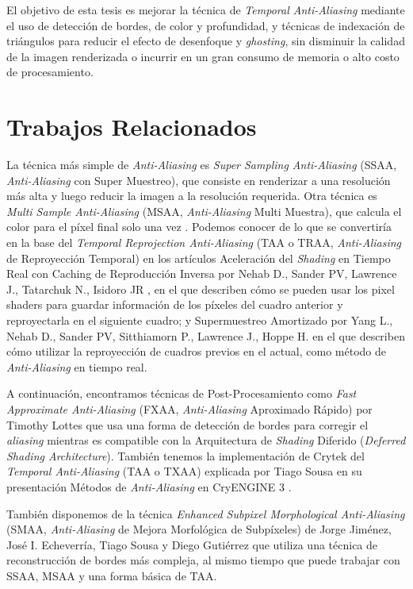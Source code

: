 \documentclass[pregrado]{tesis-usb} %
\begin{document}
El objetivo de esta tesis es mejorar la técnica de \textit{Temporal Anti-Aliasing} mediante el uso de detección de bordes, de color y profundidad, y técnicas de indexación de triángulos para reducir el efecto de desenfoque y \textit{ghosting}, sin disminuir la calidad de la imagen renderizada o incurrir en un gran consumo de memoria o alto costo de procesamiento.


\section{Trabajos Relacionados}
La técnica más simple de \textit{Anti-Aliasing} es \textit{Super Sampling Anti-Aliasing} (SSAA, \textit{Anti-Aliasing} con Super Muestreo), que consiste en renderizar a una resolución más alta y luego reducir la imagen a la resolución requerida. Otra técnica es \textit{Multi Sample Anti-Aliasing} (MSAA, \textit{Anti-Aliasing} Multi Muestra), que calcula el color para el píxel final solo una vez \cite{Doggett2017EDAN35}. Podemos conocer de lo que se convertiría en la base del \textit{Temporal Reprojection Anti-Aliasing}  (TAA o TRAA, \textit{Anti-Aliasing} de Reproyección Temporal) en los artículos Aceleración del \textit{Shading} en Tiempo Real con Caching de Reproducción Inversa por Nehab D., Sander PV, Lawrence J., Tatarchuk N., Isidoro JR \cite{Nehab2007}, en el que describen cómo se pueden usar los pixel shaders para guardar información de los píxeles del cuadro anterior y reproyectarla en el siguiente cuadro; y Supermuestreo Amortizado por Yang L., Nehab D., Sander PV, Sitthiamorn P., Lawrence J., Hoppe H. \cite{Yang2009} en el que describen cómo utilizar la reproyección de cuadros previos  en el actual, como método de \textit{Anti-Aliasing} en tiempo real.

A continuación, encontramos técnicas de Post-Procesamiento como \textit{Fast Approximate Anti-Aliasing} (FXAA, \textit{Anti-Aliasing} Aproximado Rápido) por Timothy Lottes \cite{Lottes2009} que usa una forma de detección de bordes para corregir el \textit{aliasing} mientras es compatible con la Arquitectura de \textit{Shading} Diferido (\textit{Deferred Shading Architecture}). También tenemos la implementación de Crytek del \textit{Temporal Anti-Aliasing} (TAA o TXAA) explicada por Tiago Sousa en su presentación Métodos de \textit{Anti-Aliasing} en CryENGINE 3 \cite{JIMENEZ2011_SIGGRAPH11}.

También disponemos de la técnica \textit{Enhanced Subpixel Morphological Anti-Aliasing} (SMAA, \textit{Anti-Aliasing} de Mejora Morfológica de Subpíxeles) de Jorge Jiménez, José I. Echeverría, Tiago Sousa y Diego Gutiérrez \cite{Jiménez2012} que utiliza una técnica de reconstrucción de bordes más compleja, al mismo tiempo que puede trabajar con SSAA, MSAA y una forma básica de TAA.
\end{document}
